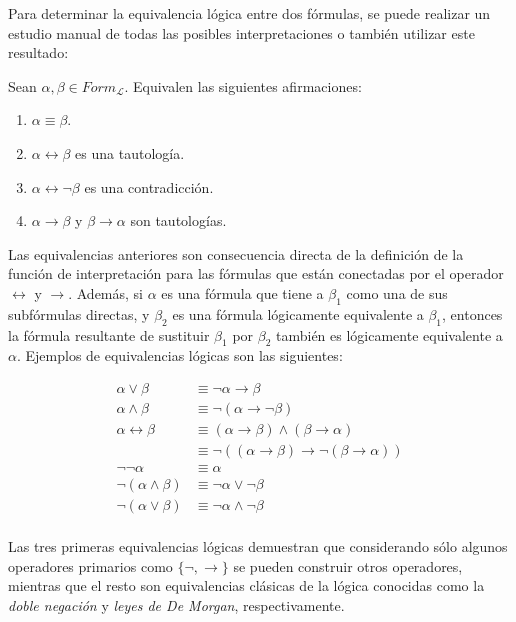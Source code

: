Para determinar la equivalencia lógica entre dos fórmulas, se puede realizar un estudio manual de todas las posibles interpretaciones o también utilizar este resultado:

\begin{proposicion}
    Sean $\alpha,\beta \in Form_{\mathcal{L}}$. Equivalen las siguientes afirmaciones:
    \begin{enumerate}[label=\roman*.]
        \item $\alpha \equiv \beta$.
        \item $\alpha \leftrightarrow \beta$ es una tautología.
        \item $\alpha \leftrightarrow \neg\beta$ es una contradicción.
        \item $\alpha \rightarrow \beta$ y $\beta \rightarrow \alpha$ son tautologías.
    \end{enumerate}
\end{proposicion}

Las equivalencias anteriores son consecuencia directa de la definición de la función de interpretación para las fórmulas que están conectadas por el operador $\leftrightarrow$ y $\rightarrow$. Además, si $\alpha$ es una fórmula que tiene a $\beta_1$ como una de sus subfórmulas directas, y $\beta_2$ es una fórmula lógicamente equivalente a $\beta_1$, entonces la fórmula resultante de sustituir $\beta_1$ por $\beta_2$ también es lógicamente equivalente a $\alpha$. Ejemplos de equivalencias lógicas son las siguientes:

\begin{align*}
    \alpha \lor \beta &\equiv \neg\alpha \rightarrow \beta \\
    \alpha \land \beta &\equiv \neg(\alpha \rightarrow \neg \beta ) \\
    \alpha \leftrightarrow \beta &\equiv (\alpha \rightarrow \beta) \land (\beta \rightarrow \alpha) \\
    &\equiv \neg((\alpha \rightarrow \beta) \rightarrow \neg(\beta \rightarrow \alpha)) \\
    \neg \neg \alpha &\equiv \alpha \\
    \neg(\alpha \land \beta) &\equiv \neg \alpha \lor \neg\beta \\
    \neg(\alpha \lor \beta) &\equiv \neg\alpha \land \neg\beta \\
\end{align*}

Las tres primeras equivalencias lógicas demuestran que considerando sólo algunos operadores primarios como $\lbrace \neg, \rightarrow \rbrace$ se pueden construir otros operadores, mientras que el resto son equivalencias clásicas de la lógica conocidas como la \textit{doble negación} y \textit{leyes de De Morgan}, respectivamente.

